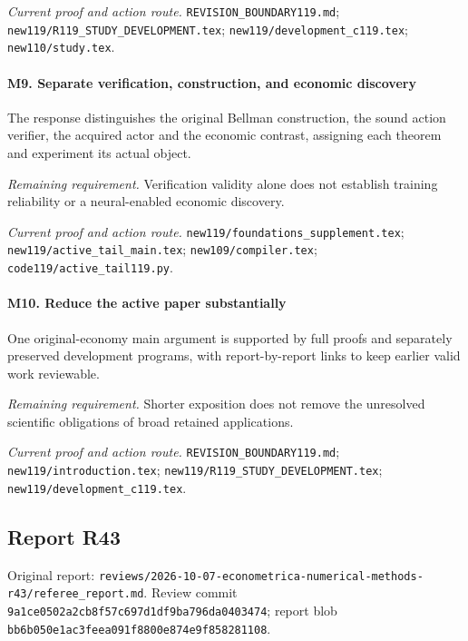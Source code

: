 \par\emph{Current proof and action route.} \nolinkurl{REVISION_BOUNDARY119.md}; \nolinkurl{new119/R119_STUDY_DEVELOPMENT.tex}; \nolinkurl{new119/development_c119.tex}; \nolinkurl{new110/study.tex}.

\paragraph{M9. Separate verification, construction, and economic discovery}

The response distinguishes the original Bellman construction, the sound action verifier, the acquired actor and the economic contrast, assigning each theorem and experiment its actual object.

\par\emph{Remaining requirement.} Verification validity alone does not establish training reliability or a neural-enabled economic discovery.

\par\emph{Current proof and action route.} \nolinkurl{new119/foundations_supplement.tex}; \nolinkurl{new119/active_tail_main.tex}; \nolinkurl{new109/compiler.tex}; \nolinkurl{code119/active_tail119.py}.

\paragraph{M10. Reduce the active paper substantially}

One original-economy main argument is supported by full proofs and separately preserved development programs, with report-by-report links to keep earlier valid work reviewable.

\par\emph{Remaining requirement.} Shorter exposition does not remove the unresolved scientific obligations of broad retained applications.

\par\emph{Current proof and action route.} \nolinkurl{REVISION_BOUNDARY119.md}; \nolinkurl{new119/introduction.tex}; \nolinkurl{new119/R119_STUDY_DEVELOPMENT.tex}; \nolinkurl{new119/development_c119.tex}.

\subsection{Report R43}

Original report: \nolinkurl{reviews/2026-10-07-econometrica-numerical-methods-r43/referee_report.md}. Review commit \nolinkurl{9a1ce0502a2cb8f57c697d1df9ba796da0403474}; report blob \nolinkurl{bb6b050e1ac3feea091f8800e874e9f858281108}.

